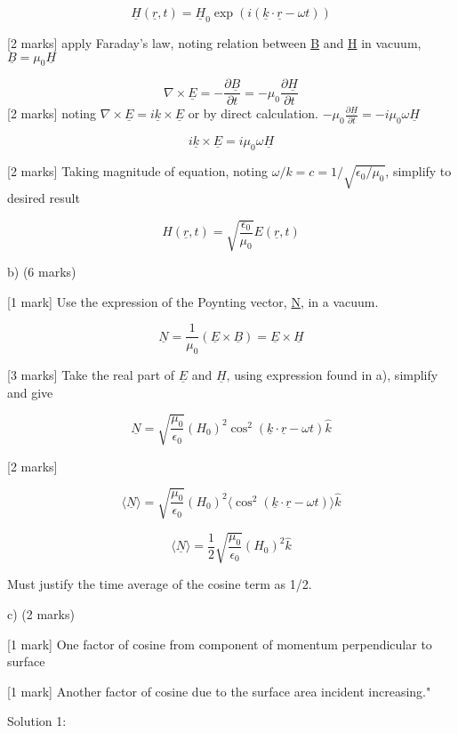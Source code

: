 \[ \underline{H}(\underline{r}, t) = \underline{H}_0 \exp (i(\underline{k} \cdot \underline{r} - \omega t)) \]

[2 marks] apply Faraday's law, noting relation between \underline{B} and \underline{H} in vacuum, \( \underline{B} = \mu_0 \underline{H} \)

\[ \nabla \times \underline{E} = - \frac{\partial \underline{B}}{\partial t} = - \mu_0 \frac{\partial \underline{H}}{\partial t}  \]
[2 marks] noting \( \nabla \times \underline{E} = i \underline{k} \times \underline{E} \) or by direct calculation. \( - \mu_0 \frac{\partial \underline{H}}{\partial t} = - i \mu_0 \omega \underline{H} \)

\[ i \underline{k} \times \underline{E} = i \mu_0 \omega \underline{H} \]

[2 marks] Taking magnitude of equation, noting \( \omega / k = c = 1 / \sqrt{\epsilon_0 / \mu_0} \), simplify to desired result 

\[ H(\underline{r}, t) = \sqrt{\frac{\epsilon_{0}}{\mu_{0}}} E(\underline{r}, t) \]

b) (6 marks)

[1 mark] Use the expression of the Poynting vector, \underline{N}, in a vacuum. 

\[ \underline{N} = \frac{1}{\mu_0} ( \underline{E} \times \underline{B} ) = \underline{E} \times \underline{H} \]

[3 marks] Take the real part of \( \underline{E} \) and \( \underline{H} \), using expression found in a), simplify and give 

\[ \underline{N} = \sqrt{\frac{\mu_0}{\epsilon_0}} (H_0)^2 \cos^2(\underline{k} \cdot \underline{r} - \omega t) \hat{k} \]

[2 marks] 

\[ \langle \underline{N} \rangle = \sqrt{\frac{\mu_0}{\epsilon_0}} (H_0)^2 \langle \cos^2(\underline{k} \cdot \underline{r} - \omega t) \rangle \hat{k} \]

\[ \langle \underline{N} \rangle = \frac{1}{2}\sqrt{\frac{\mu_0}{\epsilon_0}} (H_0)^2 \hat{k} \]

Must justify the time average of the cosine term as 1/2.

c) (2 marks) 

[1 mark] One factor of cosine from component of momentum perpendicular to surface

[1 mark] Another factor of cosine due to the surface area incident increasing."

Solution 1:


